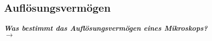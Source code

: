 \subsection{\label{subsec:FZV7}Auflösungsvermögen}
\textbf{\textit{Was bestimmt das Auflösungsvermögen eines Mikroskops?}} \\
$\rightarrow$